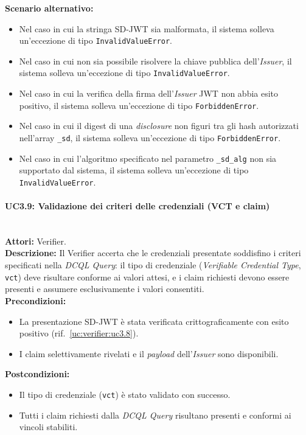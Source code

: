 \noindent\textbf{Scenario alternativo:}
\begin{itemize}
    \item Nel caso in cui la stringa SD-JWT sia malformata, il sistema solleva un'eccezione di tipo \texttt{InvalidValueError}.
    \item Nel caso in cui non sia possibile risolvere la chiave pubblica dell'\textit{Issuer}, il sistema solleva un'eccezione di tipo \texttt{InvalidValueError}.
    \item Nel caso in cui la verifica della firma dell'\textit{Issuer} JWT non abbia esito positivo, il sistema solleva un'eccezione di tipo \texttt{ForbiddenError}.
    \item Nel caso in cui il digest di una \textit{disclosure} non figuri tra gli hash autorizzati nell'array \texttt{\_\allowbreak{}sd}, il sistema solleva un'eccezione di tipo \texttt{ForbiddenError}.
    \item Nel caso in cui l'algoritmo specificato nel parametro \texttt{\_\allowbreak{}sd\_\allowbreak{}alg} non sia supportato dal sistema, il sistema solleva un'eccezione di tipo \texttt{InvalidValueError}.
\end{itemize}

\paragraph{\large\bfseries UC3.9: Validazione dei criteri delle credenziali (VCT e claim)}
\label{uc:verifier:uc3.9}
\mbox{}\\
\noindent\textbf{Attori:} Verifier.
\\
\noindent\textbf{Descrizione:} Il Verifier accerta che le credenziali presentate soddisfino i criteri specificati nella \textit{DCQL Query}: il tipo di credenziale (\textit{Verifiable Credential Type}, \texttt{vct}) deve risultare conforme ai valori attesi, e i claim richiesti devono essere presenti e assumere esclusivamente i valori consentiti.
\\
\noindent\textbf{Precondizioni:}
\begin{itemize}
    \item La presentazione SD-JWT è stata verificata crittograficamente con esito positivo (rif.\ \ref{uc:verifier:uc3.8}).
    \item I claim selettivamente rivelati e il \textit{payload} dell'\textit{Issuer} sono disponibili.
\end{itemize}
\noindent\textbf{Postcondizioni:}
\begin{itemize}
    \item Il tipo di credenziale (\texttt{vct}) è stato validato con successo.
    \item Tutti i claim richiesti dalla \textit{DCQL Query} risultano presenti e conformi ai vincoli stabiliti.
\end{itemize}

